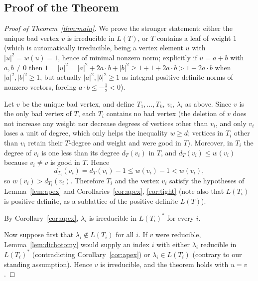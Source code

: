 \subsection*{Proof of the Theorem}

\begin{proof}[Proof of Theorem~\ref{thm:main}]
We prove the stronger statement: either the unique bad vertex $v$ is
irreducible in $L(T)$, or $T$ contains a leaf of weight $1$ (which is
automatically irreducible, being a vertex element $u$ with $|u|^2=w(u)=1$, hence
of minimal nonzero norm; explicitly if $u=a+b$ with $a,b\neq0$ then
$1=|u|^2=|a|^2+2a\cdot b+|b|^2\geq 1+1+2a\cdot b>1+2a\cdot b$ when
$|a|^2,|b|^2\ge1$, but actually $|a|^2,|b|^2\geq1$ as integral positive definite
norms of nonzero vectors, forcing $a\cdot b\le -\tfrac12<0$).

Let $v$ be the unique bad vertex, and define $T_1,\dots,T_k$, $v_i$,
$\lambda_i$ as above. Since $v$ is the only bad vertex of $T$, each $T_i$
contains no bad vertex (the deletion of $v$ does not increase any weight nor
decrease degrees of vertices other than $v_i$, and only $v_i$ loses a unit of
degree, which only helps the inequality $w\geq d$; vertices in $T_i$ other than
$v_i$ retain their $T$-degree and weight and were good in $T$). Moreover, in
$T_i$ the degree of $v_i$ is one less than its degree $d_T(v_i)$ in $T$, and
$d_T(v_i)\leq w(v_i)$ because $v_i\neq v$ is good in $T$. Hence
\[
d_{T_i}(v_i)=d_T(v_i)-1\leq w(v_i)-1<w(v_i),
\]
so $w(v_i)>d_{T_i}(v_i)$. Therefore $T_i$ and the vertex $v_i$ satisfy the
hypotheses of Lemma~\ref{lem:apex} and Corollaries~\ref{cor:apex},
\ref{cor:tight} (note also that $L(T_i)$ is positive definite, as a sublattice
of the positive definite $L(T)$).

By Corollary~\ref{cor:apex}, $\lambda_i$ is irreducible in $L(T_i)^{*}$ for
every $i$.

Now suppose first that $\lambda_i\notin L(T_i)$ for all $i$. If $v$ were
reducible, Lemma~\ref{lem:dichotomy} would supply an index $i$ with either
$\lambda_i$ reducible in $L(T_i)^{*}$ (contradicting
Corollary~\ref{cor:apex}) or $\lambda_i\in L(T_i)$ (contrary to our standing
assumption). Hence $v$ is irreducible, and the theorem holds with $u=v$.


\end{proof}
